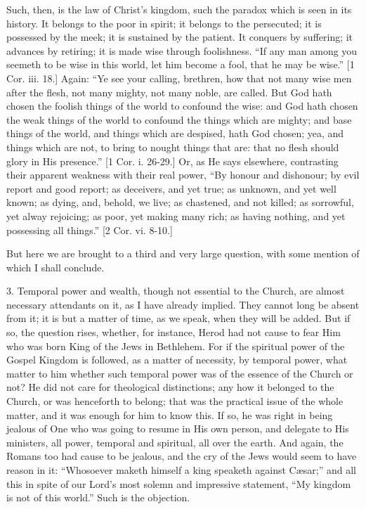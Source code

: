 Such, then, is the law of
Christ's kingdom, such the paradox which is seen in its history. It
belongs to the poor in spirit; it belongs to the persecuted; it is
possessed by the meek; it is sustained by the patient. It conquers by
suffering; it advances by retiring; it is made wise through
foolishness. ``If any man among you seemeth to be wise in this
world, let him become a fool, that he may be wise.'' [1 Cor. iii.
18.] Again: ``Ye see your calling, brethren, how that not many
wise men after the flesh, not many mighty, not many noble, are called.
But God hath chosen the foolish things of the world to confound the
wise: and God hath chosen the weak things of the world to confound the
things which are mighty; and base things of the world, and things
which are despised, hath God chosen; yea, and things which are not, to
bring to nought things that are: that no flesh should glory in His
presence.'' [1 Cor. i. 26-29.] Or, as He says elsewhere,
contrasting their apparent weakness with their real power, ``By
honour and dishonour; by evil report and good report; as deceivers,
and yet true; as unknown, and yet well known; as dying, and, behold,
we live; as chastened, and not killed; as sorrowful, yet alway
rejoicing; as poor, yet making many rich; as having nothing, and yet
possessing all things.'' [2 Cor. vi. 8-10.]

But here we are brought to a third and very large question, with
some mention of which I shall conclude.

3. Temporal power and wealth, though not essential to the Church,
are almost necessary attendants on it, as I have already implied. They
cannot long be absent from it; it is but a matter of time, as we
speak, when they will be added. But if so, the question rises,
whether, for instance, Herod had not cause to fear Him who was born
King of the Jews in Bethlehem. For if the spiritual power of the
Gospel Kingdom is followed, as a matter of necessity, by temporal
power, what matter to him whether such temporal power was of the
essence of the Church or not? He did not care for theological
distinctions; any how it belonged to the Church, or was henceforth to
belong; that was the practical issue of the whole matter, and it was
enough for him to know this. If so, he was right in being jealous of
One who was going to resume in His own person, and delegate to His
ministers, all power, temporal and spiritual, all over the earth. And
again, the Romans too had cause to be jealous, and the cry of the Jews
would seem to have reason in it: ``Whosoever maketh himself a king
speaketh against Cæsar;'' and all this in spite of our Lord's
most solemn and impressive statement, ``My kingdom is not of this
world.'' Such is the objection.

